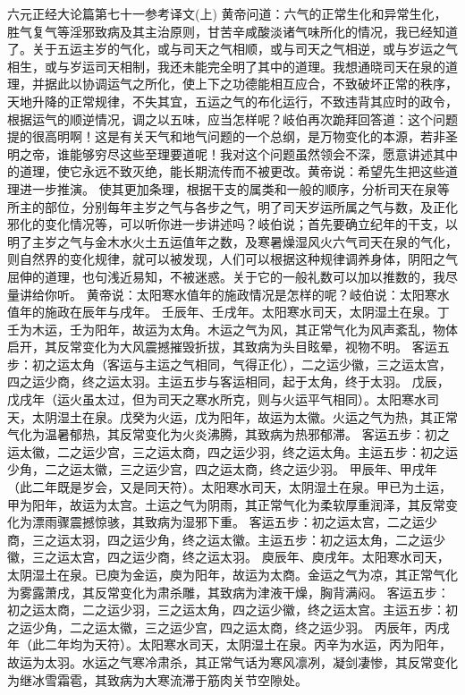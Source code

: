 \documentclass[a4paper,12pt,UTF8,twoside]{ctexbook}
\begin{document}
六元正经大论篇第七十一参考译文(上)
黄帝问道：六气的正常生化和异常生化，胜气复气等淫邪致病及其主治原则，甘苦辛咸酸淡诸气味所化的情况，我已经知道了。关于五运主岁的气化，或与司天之气相顺，或与司天之气相逆，或与岁运之气相生，或与岁运司天相制，我还未能完全明了其中的道理。我想通晓司天在泉的道理，并据此以协调运气之所化，使上下之功德能相互应合，不致破坏正常的秩序，天地升降的正常规律，不失其宜，五运之气的布化运行，不致违背其应时的政令，根据运气的顺逆情况，调之以五味，应当怎样呢？岐伯再次跪拜回答道：这个问题提的很高明啊！这是有关天气和地气问题的一个总纲，是万物变化的本源，若非圣明之帝，谁能够穷尽这些至理要道呢！我对这个问题虽然领会不深，愿意讲述其中的道理，使它永远不致灭绝，能长期流传而不被更改。黄帝说：希望先生把这些道理进一步推演。
使其更加条理，根据干支的属类和一般的顺序，分析司天在泉等所主的部位，分别每年主岁之气与各步之气，明了司天岁运所属之气与数，及正化邪化的变化情况等，可以听你进一步讲述吗？岐伯说；首先要确立纪年的干支，以明了主岁之气与金木水火土五运值年之数，及寒暑燥湿风火六气司天在泉的气化，则自然界的变化规律，就可以被发现，人们可以根据这种规律调养身体，阴阳之气屈伸的道理，也句浅近易知，不被迷惑。关于它的一般礼数可以加以推数的，我尽量讲给你听。
黄帝说：太阳寒水值年的施政情况是怎样的呢？岐伯说：太阳寒水值年的施政在辰年与戌年。
壬辰年、壬戌年。太阳寒水司天，太阴湿土在泉。丁壬为木运，壬为阳年，故运为太角。木运之气为风，其正常气化为风声紊乱，物体启开，其反常变化为大风震撼摧毁折拔，其致病为头目眩晕，视物不明。
客运五步：初之运太角（客运与主运之气相同，气得正化），二之运少徽，三之运太宫，四之运少商，终之运太羽。主运五步与客运相同，起于太角，终于太羽。
戊辰，戊戌年（运火虽太过，但为司天之寒水所克，则与火运平气相同）。太阳寒水司天，太阴湿土在泉。戊癸为火运，戊为阳年，故运为太徽。火运之气为热，其正常气化为温暑郁热，其反常变化为火炎沸腾，其致病为热邪郁滞。
客运五步：初之运太徽，二之运少宫，三之运太商，四之运少羽，终之运太角。主运五步：初之运少角，二之运太徽，三之运少宫，四之运太商，终之运少羽。
甲辰年、甲戌年（此二年既是岁会，又是同天符）。太阳寒水司天，太阴湿土在泉。甲已为土运，甲为阳年，故运为太宫。土运之气为阴雨，其正常气化为柔软厚重润泽，其反常变化为漂雨骤震撼惊骇，其致病为湿邪下重。
客运五步：初之运太宫，二之运少商，三之运太羽，四之运少角，终之运太徽。主运五步：初之运太角，二之运少徽，三之运太宫，四之运少商，终之运太羽。
庾辰年、庾戌年。太阳寒水司天，太阴湿土在泉。已庾为金运，庾为阳年，故运为太商。金运之气为凉，其正常气化为雾露萧戌，其反常变化为肃杀雕，其致病为津液干燥，胸背满闷。
客运五步：初之运太商，二之运少羽，三之运太角，四之运少徽，终之运太宫。主运五步：初之运少角，二之运太徽，三之运少宫，四之运太商，终之运少羽。
丙辰年，丙戌年（此二年均为天符）。太阳寒水司天，太阴湿土在泉。丙辛为水运，丙为阳年，故运为太羽。水运之气寒冷肃杀，其正常气话为寒风凛冽，凝剑凄惨，其反常变化为继冰雪霜雹，其致病为大寒流滞于筋肉关节空隙处。
\end{document}
